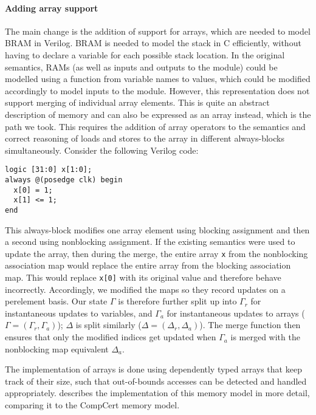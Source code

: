 \paragraph{Adding array support}
The main change is the addition of support for arrays, which are needed to model
\gls{BRAM} in Verilog.  \gls{BRAM} is needed to model the stack in C
efficiently, without having to declare a variable for each possible stack
location.  In the original semantics, RAMs (as well as inputs and outputs to the
module) could be modelled using a function from variable names to values, which
could be modified accordingly to model inputs to the module.  However, this
representation does not support merging of individual array elements.  This is
quite an abstract description of memory and can also be expressed as an array
instead, which is the path we took.  This requires the addition of array
operators to the semantics and correct reasoning of loads and stores to the
array in different always-blocks simultaneously.  Consider the following Verilog
code:
%
  \begin{center}
\begin{verbatim}
logic [31:0] x[1:0];
always @(posedge clk) begin
  x[0] = 1;
  x[1] <= 1;
end
\end{verbatim}
  \end{center}
%
This always-block modifies one array element using blocking assignment and then
a second using nonblocking assignment.  If the existing semantics were used to
update the array, then during the merge, the entire array \texttt{x} from the
nonblocking association map would replace the entire array from the blocking
association map.  This would replace \texttt{x[0]} with its original value and
therefore behave incorrectly. Accordingly, we modified the maps so they record
updates on a per\?element basis. Our state $\Gamma$ is therefore further split
up into $\Gamma_{r}$ for instantaneous updates to variables, and $\Gamma_{a}$
for instantaneous updates to arrays ($\Gamma = (\Gamma_{r}, \Gamma_{a})$);
$\Delta$ is split similarly ($\Delta = (\Delta_{r}, \Delta_{a})$). The merge
function then ensures that only the modified indices get updated when
$\Gamma_{a}$ is merged with the nonblocking map equivalent $\Delta_{a}$.

The implementation of arrays is done using dependently typed arrays that keep
track of their size, such that out-of-bounds accesses can be detected and
handled appropriately.   describes the implementation
of this memory model in more detail, comparing it to the CompCert memory model.

